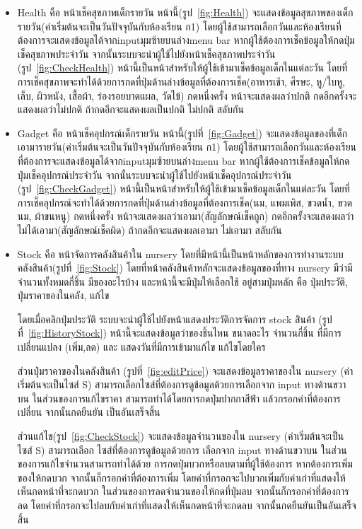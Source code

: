 \begin{itemize}
  \item  Health คือ หน้าเช็คสุขภาพเด็กรายวัน หน้านี้(รูป~\ref{fig:Health}) จะแสดงข้อมูลสุขภาพของเด็กรายวัน(ค่าเริ่มต้นจะเป็นวันปัจจุบันกับห้องเรียน ก1) โดยผู้ใช้สามารถเลือกวันและห้องเรียนที่ต้องการจะแสดงข้อมูลได้จากinputมุมซ้ายบนล่างmenu bar 
  หากผู้ใช้ต้องการเช็คข้อมูลให้กดปุ่มเช็คสุขภาพประจำวัน จากนั้นระบบจะนำผู้ใช้ไปยังหน้าเช็คสุขภาพประจำวัน (รูป~\ref{fig:CheckHealth}) 
  หน้านี้เป็นหน้าสำหรับให้ผู้ใช้เข้ามาเช็คข้อมูลเด็กในแต่ละวัน โดยที่การเช็คสุขภาพจะทำได้ด้วยการกดที่ปุ่มด้านล่างข้อมูลที่ต้องการเช็ค(อาหารเช้า, ศีรษะ, หู/ใบหู, เล็บ, ผิวหนัง, เสื้อผ้า, ร่องรอยบาดแผล, วัดไข้) กดหนึ่งครั้ง
  หน้าจะแสดงผลว่าปกติ กดอีกครั้งจะแสดงผลว่าไม่ปกติ ถ้ากดอีกจะแสดงผลเป็นปกติ ไม่ปกติ สลับกัน


  \item  Gadget คือ หน้าเช็คอุปกรณ์เด็กรายวัน หน้านี้(รูปที่~\ref{fig:Gadget}) จะแสดงข้อมูลของที่เด็กเอามารายวัน(ค่าเริ่มต้นจะเป็นวันปัจจุบันกับห้องเรียน ก1) โดยผู้ใช้สามารถเลือกวันและห้องเรียนที่ต้องการจะแสดงข้อมูลได้จากinputมุมซ้ายบนล่างmenu bar 
  หากผู้ใช้ต้องการเช็คข้อมูลให้กดปุ่มเช็คอุปกรณ์ประจำวัน จากนั้นระบบจะนำผู้ใช้ไปยังหน้าเช็คอุปกรณ์ประจำวัน (รูป~\ref{fig:CheckGadget}) 
  หน้านี้เป็นหน้าสำหรับให้ผู้ใช้เข้ามาเช็คข้อมูลเด็กในแต่ละวัน โดยที่การเช็คอุปกรณ์จะทำได้ด้วยการกดที่ปุ่มด้านล่างข้อมูลที่ต้องการเช็ค(นม, แพมเพิส, ขวดน้ำ, ขวดนม, ผ้าขนหนู) กดหนึ่งครั้ง
  หน้าจะแสดงผลว่าเอามา(สัญลักษณ์เช็คถูก) กดอีกครั้งจะแสดงผลว่าไม่ได้เอามา(สัญลักษณ์เช็คผิด) ถ้ากดอีกจะแสดงผลเอามา ไม่เอามา สลับกัน
  
  \item  Stock คือ หน้าจัดการคลังสินค้าใน nursery โดยที่มีหน้านี้เป็นหน้าหลักของการทำงานระบบคลังสินค้า(รูปที่~\ref{fig:Stock}) โดยที่หน้าคลังสินค้าหลักจะแสดงข้อมูลของที่ทาง nursery มีว่ามีจำนวนทั้งหมดกี่ชิ้น มีของอะไรบ้าง และหน้านี้จะมีปุ่มให้เลือกใช้
  อยู่สามปุ่มหลัก คือ ปุ่มประวัติ, ปุ่มราคาของในคลัง, แก้ไข 
  
  โดยเมื่อคลิกปุ่มประวัติ ระบบจะนำผู้ใช้ไปยังหน้าแสดงประวัติการจัดการ stock สินค้า (รูปที่~\ref{fig:HistoryStock}) หน้านี้จะแสดงข้อมูลว่าของชิ้นไหน ขนาดอะไร จำนวนกี่ชิ้น ที่มีการเปลี่ยนแปลง (เพิ่ม,ลด) และ แสดงวันที่มีการเข้ามาแก้ไข แก้ไขโดยใคร
  
  ส่วนปุ่มราคาของในคลังสินค้า (รูปที่~\ref{fig:editPrice}) จะแสดงข้อมูลราคาของใน nursery (ค่าเริ่มต้นจะเป็นไซส์ S) สามารถเลือกไซส์ที่ต้องการดูข้อมูลด้วยการเลือกจาก input ทางด้านขวาบน ในส่วนของการแก้ไขราคา สามารถทำได้โดยการกดปุ่มปากกาสีฟ้า แล้วกรอกค่าที่ต้องการเปลี่ยน
  จากนั้นกดยืนยัน เป็นอันเสร็จสิ้น
  
  ส่วนแก้ไข(รูป~\ref{fig:CheckStock}) จะแสดงข้อมูลจำนวนของใน nursery (ค่าเริ่มต้นจะเป็นไซส์ S) สามารถเลือก
  ไซส์ที่ต้องการดูข้อมูลด้วยการ เลือกจาก input ทางด้านขวาบน ในส่วนของการแก้ไขจำนวนสามารถทำได้ด้วย การกดปุ่มบวกหรือลบตามที่ผู้ใช้ต้องการ 
  หากต้องการเพิ่มของให้กดบวก จากนั้นก็กรอกค่าที่ต้องการเพิ่ม โดยค่าที่กรอกจะไปบวกเพิ่มกับค่าเก่าที่แสดงให้เห็นกดหน้าที่จะกดบวก 
  ในส่วนของการลดจำนวนของให้กดที่ปุ่มลบ จากนั้นก็กรอกค่าที่ต้องการลด โดยค่าที่กรอกจะไปลบกับค่าเก่าที่แสดงให้เห็นกดหน้าที่จะกดลบ จากนั้นกดยืนยันเป็นอันเสร็จสิ้น
  

\end{itemize}
